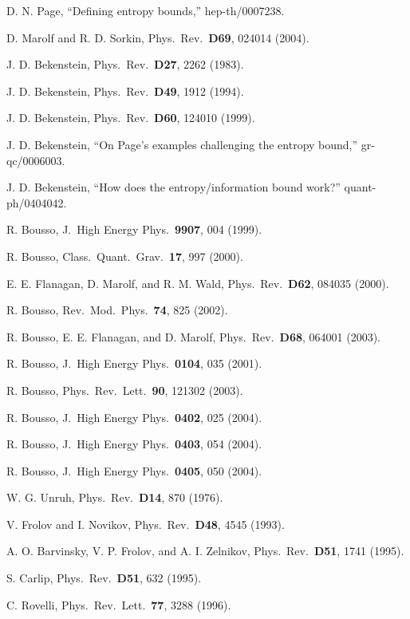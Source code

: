 \documentclass[12pt]{article} \usepackage{latexsym}
\begin{document}
\begin{thebibliography}{99}
 D. N. Page, ``Defining entropy bounds,''
  hep-th/0007238.

 D. Marolf and R. D. Sorkin, Phys.\ Rev.\ {\bf D69}, 024014
  (2004).

 J. D. Bekenstein, Phys.\ Rev.\ {\bf D27}, 2262 (1983).

 J. D. Bekenstein, Phys.\ Rev.\ {\bf D49}, 1912 (1994).

 J. D. Bekenstein, Phys.\ Rev.\ {\bf D60}, 124010
  (1999).

 J. D. Bekenstein, ``On Page's examples challenging the
  entropy bound,'' gr-qc/0006003.

 J. D. Bekenstein, ``How does the entropy/information
  bound work?'' quant-ph/0404042.

 R. Bousso, J.\ High Energy Phys.\ {\bf 9907}, 004
  (1999).

 R. Bousso, Class.\ Quant.\ Grav.\ {\bf 17}, 997
  (2000).

 E. E. Flanagan, D. Marolf, and R. M. Wald, Phys.\ Rev.\
  {\bf D62}, 084035 (2000).

 R. Bousso, Rev.\ Mod.\ Phys.\ {\bf 74}, 825 (2002).

 R. Bousso, E. E. Flanagan, and D. Marolf, Phys.\ Rev.\
  {\bf D68}, 064001 (2003).

 R. Bousso, J.\ High Energy Phys.\ {\bf 0104}, 035
  (2001).

 R. Bousso, Phys.\ Rev.\ Lett.\ {\bf 90}, 121302 (2003).

\bibitem{Bousso04a} R. Bousso, J.\ High Energy Phys.\ {\bf 0402}, 025
  (2004).

 R. Bousso, J.\ High Energy Phys.\ {\bf 0403}, 054
  (2004).

 R. Bousso, J.\ High Energy Phys.\ {\bf 0405}, 050
  (2004).

 W. G. Unruh, Phys.\ Rev.\ {\bf D14}, 870 (1976).

\bibitem{FN} V. Frolov and I. Novikov, Phys.\ Rev.\ {\bf D48}, 4545
  (1993).

 A. O. Barvinsky, V. P. Frolov, and A. I. Zelnikov,
  Phys.\ Rev.\ {\bf D51}, 1741 (1995).

 S. Carlip, Phys.\ Rev.\ {\bf D51}, 632 (1995).

 C. Rovelli, Phys.\ Rev.\ Lett.\ {\bf 77}, 3288
  (1996).


\end{thebibliography}
\end{document}
